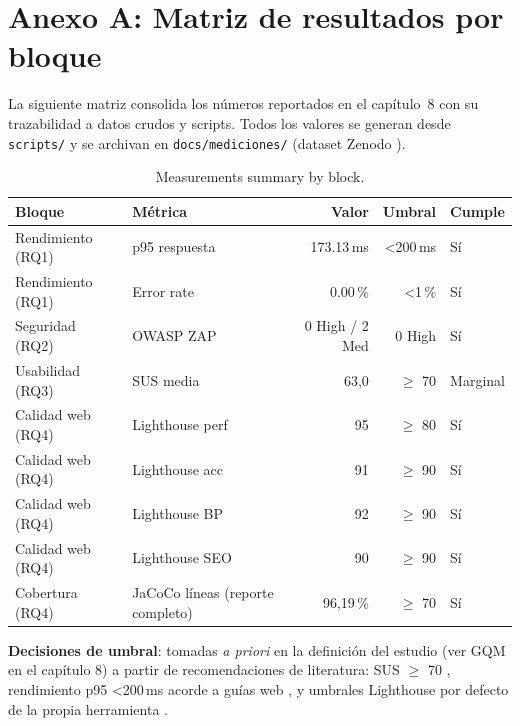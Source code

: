 \clearpage
\chapter*{Anexo A: Matriz de resultados por bloque}

La siguiente matriz consolida los números reportados en el capítulo~8 con su
trazabilidad a datos crudos y scripts. Todos los valores se generan desde
\texttt{scripts/} y se archivan en \texttt{docs/mediciones/} (dataset Zenodo
\cite{dataset_sgroas}).

\begin{table}[H]
\centering
\small
\caption{Measurements summary by block.}
\begin{tabular}{@{}llrrl@{}}
\toprule
\textbf{Bloque} & \textbf{Métrica} & \textbf{Valor} & \textbf{Umbral} & \textbf{Cumple} \\
\midrule
Rendimiento (RQ1) & p95 respuesta & 173.13\,ms & \textless 200\,ms & Sí \\
Rendimiento (RQ1) & Error rate & 0.00\,\% & \textless 1\,\% & Sí \\
Seguridad (RQ2) & OWASP ZAP & 0 High / 2 Med & 0 High & Sí \\
Usabilidad (RQ3) & SUS media & 63,0 & $\geq$ 70 & Marginal \\
Calidad web (RQ4) & Lighthouse perf & 95 & $\geq$ 80 & Sí \\
Calidad web (RQ4) & Lighthouse acc & 91 & $\geq$ 90 & Sí \\
Calidad web (RQ4) & Lighthouse BP & 92 & $\geq$ 90 & Sí \\
Calidad web (RQ4) & Lighthouse SEO & 90 & $\geq$ 90 & Sí \\
Cobertura (RQ4) & JaCoCo líneas (reporte completo) & 96,19\,\% & $\geq$ 70 & Sí \\
\bottomrule
\end{tabular}
\end{table}

\textbf{Decisiones de umbral}: tomadas \emph{a priori} en la definición del
estudio (ver GQM en el capítulo 8) a partir de recomendaciones de literatura:
SUS $\geq$ 70 \cite{bangor2009}, rendimiento p95 \textless 200\,ms acorde a
guías web \cite{foo2015}, y umbrales Lighthouse por defecto de la propia
herramienta \cite{lighthouse}.


